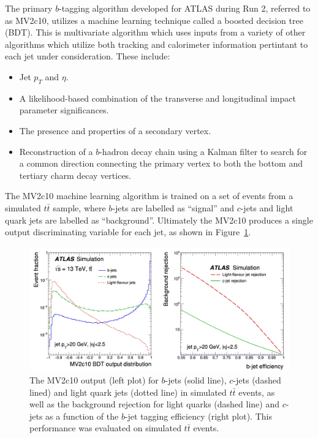 The primary $b$-tagging algorithm developed for ATLAS during Run 2, referred to as MV2c10, utilizes a machine learning technique called a boosted decision tree (BDT).
This is multivariate algorithm which uses inputs from a variety of other algorithms which utilize both tracking and calorimeter information pertintant to each jet under consideration. These include:
\begin{itemize}
    \itemsep0em 
    \item Jet $p_T$ and $\eta$.
    \item A likelihood-based combination of the transverse and longitudinal impact parameter significances. %
    \item The presence and properties of a secondary vertex.
    \item Reconstruction of a $b$-hadron decay chain using a Kalman filter to search for a common direction connecting the primary vertex to both the bottom and tertiary charm decay vertices.
\end{itemize}

The MV2c10 machine learning algorithm is trained on a set of events from a simulated $t\bar{t}$ sample, where $b$-jets are labelled as ``signal'' and $c$-jets and light quark jets are labelled as ``background''.
Ultimately the MV2c10 produces a single output discriminating variable for each jet, as shown in Figure~\ref{fig:mv2c10_discriminant}.

\begin{figure}
	\centering
	\includegraphics[width=\textwidth]{mv2c10_discriminant}
	\caption{
	The MV2c10 output (left plot) for $b$-jets (solid line), $c$-jets (dashed lined) and light quark jets (dotted line) in simulated $t\bar{t}$ events, as well as the background rejection for light quarks (dashed line) and $c$-jets as a function of the $b$-jet tagging efficiency (right plot).
	This performance was evaluated on simulated $t\bar{t}$ events.
    \cite{Aaboud:2018xwy}
	}
	\label{fig:mv2c10_discriminant}
\end{figure}


